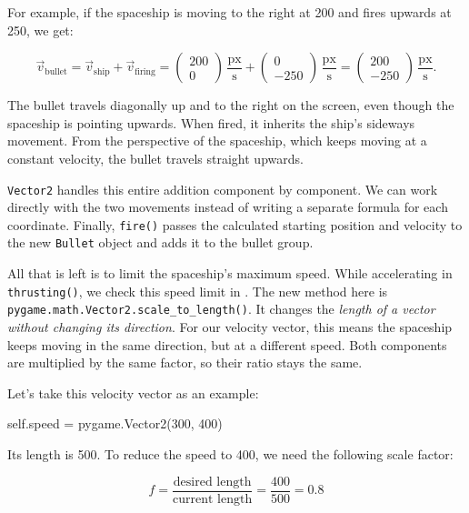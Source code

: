 For example, if the spaceship is moving to the right at \SI{200}{\pxsec} and fires upwards at \SI{250}{\pxsec}, we get:

\[
\vec{v}_{\mathrm{bullet}}
=
\vec{v}_{\mathrm{ship}} + \vec{v}_{\mathrm{firing}}
=
\begin{pmatrix} 200 \\ 0 \end{pmatrix}\,\frac{\mathrm{px}}{\mathrm{s}}
+
\begin{pmatrix} 0 \\ -250 \end{pmatrix}\,\frac{\mathrm{px}}{\mathrm{s}}
=
\begin{pmatrix} 200 \\ -250 \end{pmatrix}\,\frac{\mathrm{px}}{\mathrm{s}}.
\]

The bullet travels diagonally up and to the right on the screen, even though the spaceship is pointing upwards. When fired, it inherits the ship's sideways movement. From the perspective of the spaceship, which keeps moving at a constant velocity, the bullet travels straight upwards.

\texttt{Vector2} handles this entire addition component by component. We can work directly with the two movements instead of writing a separate formula for each coordinate. Finally, \texttt{fire()} passes the calculated starting position and velocity to the new \texttt{Bullet} object and adds it to the bullet group.

All that is left is to limit the spaceship's maximum speed. While accelerating in \texttt{thrusting()}, we check this speed limit in . The new method here is \texttt{pygame\-.math\-.Vector2\-.scale\_to\_length()}. It changes the \emph{length of a vector without changing its direction}. For our velocity vector, this means the spaceship keeps moving in the same direction, but at a different speed. Both components are multiplied by the same factor, so their ratio stays the same.

Let's take this velocity vector as an example:
\begin{codebox}
	self.speed = pygame.Vector2(300, 400)
\end{codebox}

Its length is 500. To reduce the speed to 400, we need the following scale factor:

\[
f = \frac{\text{desired length}}{\text{current length}}
= \frac{400}{500}
= 0.8
\]

